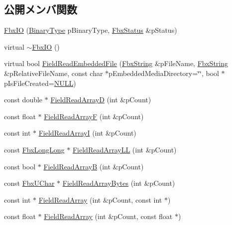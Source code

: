 \subsection*{公開メンバ関数}
\begin{DoxyCompactItemize}
\item 
\hyperlink{class_fbx_i_o_a328bf0d723833d6bd3717c7865d9b5b0}{Fbx\+IO} (\hyperlink{class_fbx_i_o_ad0532f36367fa6b750993000dfb8ed1e}{Binary\+Type} p\+Binary\+Type, \hyperlink{class_fbx_status}{Fbx\+Status} \&p\+Status)
\item 
virtual \hyperlink{class_fbx_i_o_a2f154dad101f0251a38f819222d01807}{$\sim$\+Fbx\+IO} ()
\item 
virtual bool \hyperlink{class_fbx_i_o_ab84c40202aafdfd46e070178c3fc1cc8}{Field\+Read\+Embedded\+File} (\hyperlink{class_fbx_string}{Fbx\+String} \&p\+File\+Name, \hyperlink{class_fbx_string}{Fbx\+String} \&p\+Relative\+File\+Name, const char $\ast$p\+Embedded\+Media\+Directory=\char`\"{}\char`\"{}, bool $\ast$p\+Is\+File\+Created=\hyperlink{fbxarch_8h_a070d2ce7b6bb7e5c05602aa8c308d0c4}{N\+U\+LL})
\item 
const double $\ast$ \hyperlink{class_fbx_i_o_ac1359003d4072ac2a4a1d8bd6c4b95a7}{Field\+Read\+ArrayD} (int \&p\+Count)
\item 
const float $\ast$ \hyperlink{class_fbx_i_o_a52292adedaf6b1ffc357571fe1f896c7}{Field\+Read\+ArrayF} (int \&p\+Count)
\item 
const int $\ast$ \hyperlink{class_fbx_i_o_aa04fbcb38ce5fd8cf4b20d992c87f1ad}{Field\+Read\+ArrayI} (int \&p\+Count)
\item 
const \hyperlink{fbxtypes_8h_ac34da60c22b0a7e1156e5480da7d71f1}{Fbx\+Long\+Long} $\ast$ \hyperlink{class_fbx_i_o_a266f3db3325e427d0fe52c813c7a2f6b}{Field\+Read\+Array\+LL} (int \&p\+Count)
\item 
const bool $\ast$ \hyperlink{class_fbx_i_o_a2c1cd02e013fc12ad530e61b1553b7f4}{Field\+Read\+ArrayB} (int \&p\+Count)
\item 
const \hyperlink{fbxtypes_8h_a1be3cadf61e76f49142eb83e66ffe8bd}{Fbx\+U\+Char} $\ast$ \hyperlink{class_fbx_i_o_a77cfc95a0a4a68895d40d4bf3e493400}{Field\+Read\+Array\+Bytes} (int \&p\+Count)
\item 
const int $\ast$ \hyperlink{class_fbx_i_o_a7cb565e52225df5537d377506f971eae}{Field\+Read\+Array} (int \&p\+Count, const int $\ast$)
\item 
const float $\ast$ \hyperlink{class_fbx_i_o_abcff764be3af4fa295a81f45148258a5}{Field\+Read\+Array} (int \&p\+Count, const float $\ast$)
\item 

\end{DoxyCompactItemize}
